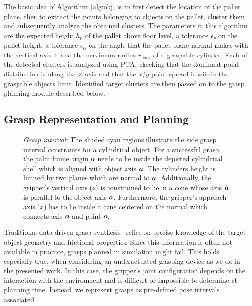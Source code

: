 The basic idea of Algorithm~\ref{alg:obj} is to first detect the location of the pallet plane, then
to extract the points belonging to objects on the pallet, cluster them and subsequently analyze the
obtained clusters. The parameters in this algorithm are the expected height $h_p$ of the
pallet above floor level, a tolerance $\epsilon_p$ on the pallet height, a tolerance
$\epsilon_{\alpha}$ on the angle that the pallet plane normal makes with the vertical axis $\mbox{\boldmath $z$}$
and the maximum radius $r_{max}$ of a graspable cylinder. Each of the detected clusters is analyzed
using PCA, checking that the dominant point distribution is along the $\mbox{\boldmath $z$}$ axis and that the
$x/y$ point spread is within the graspable objects limit. Identified target clusters are then passed
on to the grasp planning module described below.
%
\subsection{Grasp Representation and Planning}
\label{subsec:grasp_planning}
%
\begin{figure}[t!] 
   \centering
    \def\svgwidth{235pt} 
     
    \caption{\textit{Grasp interval:} The shaded cyan regions illustrate the side grasp interval
      constraints for a cylindrical object. For a successful grasp, the palm frame origin $\mbox{\boldmath $o$}$
      needs to lie inside the depicted cylindrical shell which is aligned with object axis
      $\mbox{\boldmath $a$}$. The cylinders height is limited by two planes which are normal to
      $\mbox{\boldmath $a$}$. Additionally, the gripper's vertical axis ($z$) is constrained to lie in a cone
      whose axis $\hat{\mbox{\boldmath $a$}}$ is parallel to the object axis $\mbox{\boldmath $a$}$. Furthermore, the
      gripper's approach axis ($x$) has to lie inside a cone centered on the normal which connects
      axis $\mbox{\boldmath $a$}$ and point $\mbox{\boldmath $o$}$.}
   \label{fig:grasp_interval}
   \vspace{-0.5cm}
\end{figure}
%
Traditional data-driven grasp synthesis~\cite{Bohg14} relies on precise knowledge of the target
object geometry and frictional properties. Since this information is often not available in
practice, grasps planned in simulation might fail. This holds especially true, when considering an
underactuated grasping device as we do in the presented work. In this case, the gripper's joint
configuration depends on the interaction with the environment and is difficult or impossible to
determine at planning time. Instead, we represent grasps as pre-defined pose intervals associated
